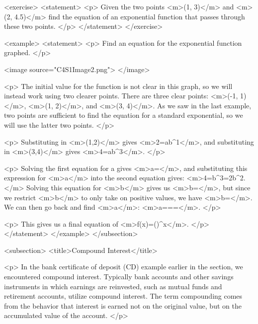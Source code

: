         <exercise>
            <statement>
                <p>
                    Given the two points <m>(1, 3)</m> and <m>(2, 4.5)</m> find the equation of an exponential function that passes through these two points.
                </p>
            </statement>
        </exercise>

        <example>
            <statement>
                <p>
                    Find an equation for the exponential function graphed.
                </p>

                <image source="C4S1Image2.png">
                </image>

                <p>
                    The initial value for the function is not clear in this graph, so we will instead work using two clearer points.
                    There are three clear points: <m>(-1, 1)</m>, <m>(1, 2)</m>, and <m>(3, 4)</m>.
                    As we saw in the last example, two points are sufficient to find the equation for a standard exponential, so we will use the latter two points.
                </p>

                <p>
                    Substituting in <m>(1,2)</m> gives <m>2=ab^{1}</m>, and substituting in <m>(3,4)</m> gives <m>4=ab^{3}</m>.
                </p>

                <p>
                    Solving the first equation for a gives <m>a=</m>, and substituting this expression for <m>a</m> into the second equation gives: <m>4=b^{3}=2b^{2}.</m> Solving this equation for <m>b</m> gives us <m>b=\pm {}</m>, but since we restrict <m>b</m> to only take on positive values, we have <m>b=</m>.
                    We can then go back and find <m>a</m>: <m>a===</m>.
                </p>

                <p>
                    This gives us a final equation of <m>f(x)=()^{x}</m>.
                </p>
            </statement>
        </example>
    </subsection>


    <subsection>
        <title>Compound Interest</title>

        <p>
            In the bank certificate of deposit (CD) example earlier in the section, we encountered compound interest.
            Typically bank accounts and other savings instruments in which earnings are reinvested, such as mutual funds and retirement accounts, utilize compound interest.
            The term compounding comes from the behavior that interest is earned not on the original value, but on the accumulated value of the account.
        </p>

